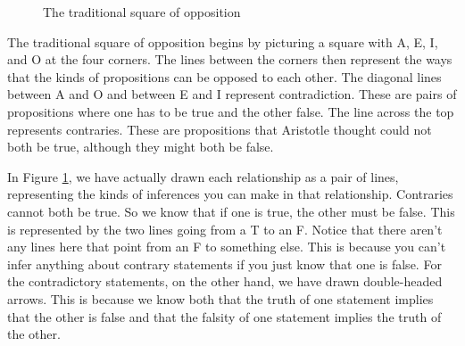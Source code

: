\begin{figure}
\begin{mdframed}[style=mytablebox]
\begin{center}
\end{center}
\end{mdframed}
\caption{The traditional square of opposition}
\label{fig:traditionalsquare}
\end{figure}

The traditional square of opposition begins by picturing a square with A, E, I, and O at the four corners. The lines between the corners then represent the ways that the kinds of propositions can be opposed to each other. The diagonal lines between A and O and between E and I represent contradiction. These are pairs of propositions where one has to be true and the other false. The line across the top represents contraries. These are propositions that Aristotle thought could not both be true, although they might both be false.

In Figure \ref{fig:traditionalsquare}, we have actually drawn each relationship as a pair of lines, representing the kinds of inferences you can make in that relationship. Contraries cannot both be true. So we know that if one is true, the other must be false. This is represented by the two lines going from a T to an F. Notice that there aren't any lines here that point from an F to something else. This is because you can't infer anything about contrary statements if you just know that one is false. For the contradictory statements, on the other hand, we have drawn double-headed arrows. This is because we know both that the truth of one statement implies that the other is false and that the falsity of one statement implies the truth of the other.

